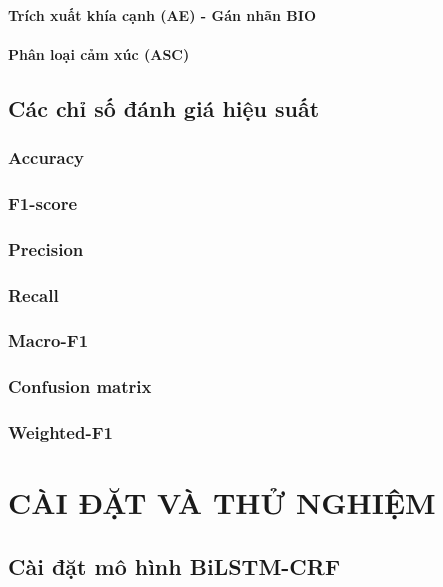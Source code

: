 \documentclass[12pt,a4paper]{report}
\begin{document}
\subsubsection{Trích xuất khía cạnh (AE) - Gán nhãn BIO}

\subsubsection{Phân loại cảm xúc (ASC)}


\section{Các chỉ số đánh giá hiệu suất}

\subsection{Accuracy}

\subsection{F1-score}

\subsection{Precision}


\subsection{Recall}

\subsection{Macro-F1}

\subsection{Confusion matrix}


\subsection{Weighted-F1}



\chapter{CÀI ĐẶT VÀ THỬ NGHIỆM}

\section{Cài đặt mô hình  BiLSTM-CRF}
\end{document}
